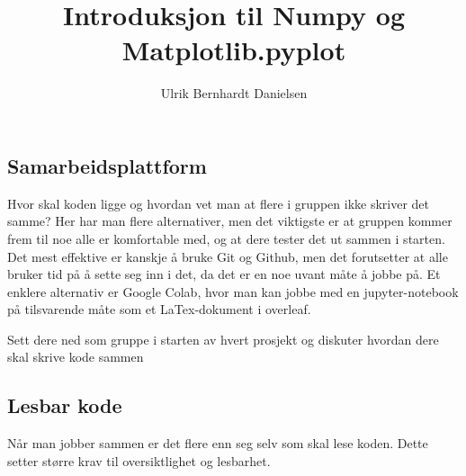\documentclass[a4paper,12pt]{article}
\title{Introduksjon til Numpy og Matplotlib.pyplot}
\author{Ulrik Bernhardt Danielsen}
\begin{document}
\maketitle



\lstset{style=mystyle}

\newcommand{\inlinecode}[1]{\colorbox{backcolour}{\lstinline{#1}}}


\subsection{Samarbeidsplattform}
Hvor skal koden ligge og hvordan vet man at flere i gruppen ikke skriver det samme? Her har man flere alternativer, men det viktigste er at gruppen kommer frem til noe alle er komfortable med, og at dere tester det ut sammen i starten. Det mest effektive er kanskje å bruke Git og Github, men det forutsetter at alle bruker tid på å sette seg inn i det, da det er en noe uvant måte å jobbe på. Et enklere alternativ er Google Colab, hvor man kan jobbe med en jupyter-notebook på tilsvarende måte som et LaTex-dokument i overleaf. 

\begin{mdframed}[frametitle={Tips!}]
Sett dere ned som gruppe i starten av hvert prosjekt og diskuter hvordan dere skal skrive kode sammen
\end{mdframed}

\subsection{Lesbar kode}
Når man jobber sammen er det flere enn seg selv som skal lese koden. Dette setter større krav til oversiktlighet og lesbarhet. 
\end{document}
